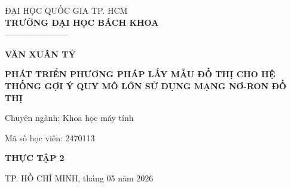 \singlespacing
\begin{boxA}
\begin{titlepage}
\vspace{1em}

\begin{center}
    \fontsize{14}{20}\selectfont
    ĐẠI HỌC QUỐC GIA TP. HCM \\
    \bf TRƯỜNG ĐẠI HỌC BÁCH KHOA \\
  --------------------



\end{center}

\vspace{4em}

\begin{center}
    \fontsize{15}{20}\selectfont
    \textbf{VĂN XUÂN TỶ} \\
\end{center}



\vspace{4em}
\begin{center}
    \fontsize{17}{25}\selectfont
    \textbf{PHÁT TRIỂN PHƯƠNG PHÁP LẤY MẪU ĐỒ THỊ CHO HỆ THỐNG GỢI Ý QUY MÔ LỚN SỬ DỤNG MẠNG NƠ-RON ĐỒ THỊ} \\
\end{center}
\vspace{2em}

\hspace{6em}Chuyên ngành: Khoa học máy tính

\hspace{6em}Mã số học viên: 2470113

\vspace{4em}

\begin{center}
    \fontsize{21}{20}\selectfont
    \textbf{THỰC TẬP 2} \\
\end{center}


\vspace{10em}

\begin{center}
\fontsize{12}{20}\selectfont
    TP. HỒ CHÍ MINH, tháng 05 năm 2026 \\
\end{center}
\end{titlepage}
\end{boxA}
\onehalfspacing